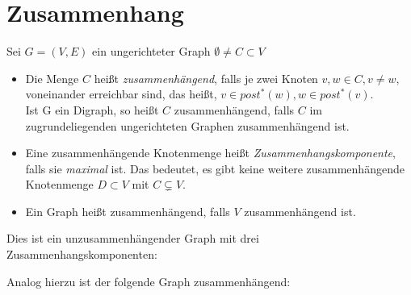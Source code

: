 \section{Zusammenhang}
\begin{definition}
Sei $G=(V,E)$ ein ungerichteter Graph $\emptyset \neq C \subset V$
\begin{itemize}
	\item Die Menge $C$ heißt \emph{zusammenhängend}, falls je zwei Knoten $v,w \in C , v\neq w,$ voneinander erreichbar sind, das heißt, $v \in post^*(w), w \in post^{*}(v)$. \\
Ist G ein Digraph, so heißt $C$ zusammenhängend, falls $C$ im zugrundeliegenden ungerichteten Graphen zusammenhängend ist.
\item Eine zusammenhängende Knotenmenge heißt \emph{Zusammenhangskomponente}, falls sie \emph{maximal} ist. Das bedeutet, es gibt keine weitere zusammenhängende Knotenmenge $D \subset V$ mit $C \subsetneq V$.
\item Ein Graph heißt zusammenhängend, falls $V$ zusammenhängend ist.
\end{itemize}
\end{definition}
\begin{example}
Dies ist ein unzusammenhängender Graph mit drei Zusammenhangskomponenten:
\begin{center}
\end{center}
Analog hierzu ist der folgende Graph zusammenhängend:
\begin{center}
\end{center}
\end{example}
